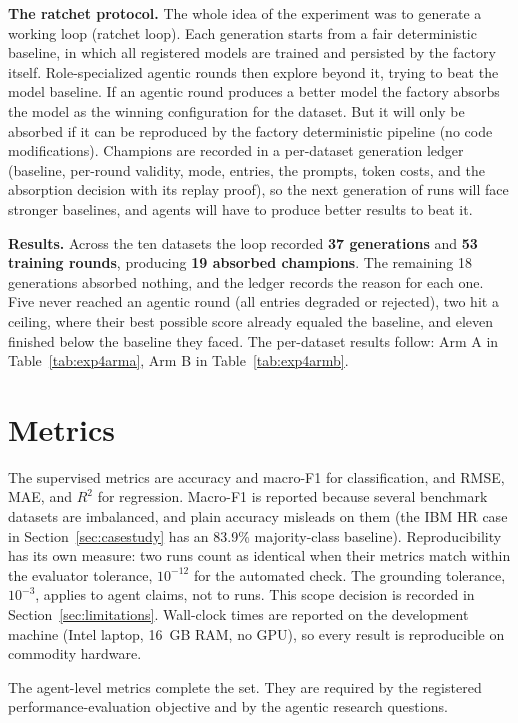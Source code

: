 \textbf{The ratchet protocol.} The whole idea of the experiment was to generate a working loop (ratchet loop). Each generation starts from a fair deterministic baseline, in which all registered models are trained and persisted by the factory itself. Role-specialized agentic rounds then explore beyond it, trying to beat the model baseline. If an agentic round produces a better model the factory absorbs the model as the winning configuration for the dataset. But it will only be absorbed if it can be reproduced by the factory deterministic pipeline (no code modifications). Champions are recorded in a per-dataset generation ledger (baseline, per-round validity, mode, entries, the prompts, token costs, and the absorption decision with its replay proof), so the next generation of runs will face stronger baselines, and agents will have to produce better results to beat it.

\textbf{Results.} Across the ten datasets the loop recorded \textbf{37 generations} and \textbf{53 training rounds}, producing \textbf{19 absorbed champions}. The remaining 18 generations absorbed nothing, and the ledger records the reason for each one. Five never reached an agentic round (all entries degraded or rejected), two hit a ceiling, where their best possible score already equaled the baseline, and eleven finished below the baseline they faced. The per-dataset results follow: Arm A in Table~\ref{tab:exp4arma}, Arm B in Table~\ref{tab:exp4armb}.



\section{Metrics}
\label{sec:metrics}

The supervised metrics are accuracy and macro-F1 for classification, and
RMSE, MAE, and $R^2$ for regression. Macro-F1 is reported because several
benchmark datasets are imbalanced, and plain accuracy misleads on them (the
IBM HR case in Section~\ref{sec:casestudy} has an 83.9\% majority-class
baseline). Reproducibility has its own measure: two runs count as identical
when their metrics match within the evaluator tolerance, $10^{-12}$ for the
automated check. The grounding tolerance, $10^{-3}$, applies to agent
claims, not to runs. This scope decision is recorded in Section~\ref{sec:limitations}.
Wall-clock times are reported on the development machine (Intel laptop,
16~GB RAM, no GPU), so every result is reproducible on commodity hardware.

The agent-level metrics complete the set. They are required by the registered performance-evaluation objective and by the agentic research questions.

